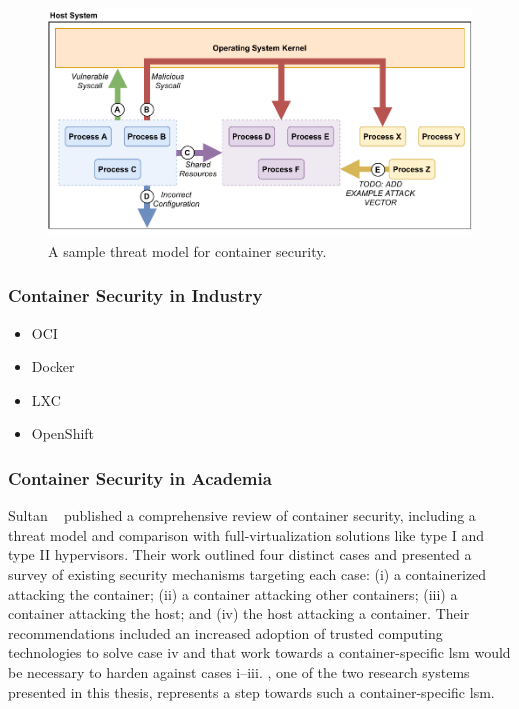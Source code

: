 \begin{figure}[tbp]
  \centering
  \includegraphics[width=0.8\linewidth]{figs/background/container_security.pdf}
  \caption[A sample threat model for container security]{
    A sample threat model for container security.
  }%
  \label{fig:containersec}
\end{figure}

\subsubsection{Container Security in Industry}%
\label{sss:container-security-industry}

\begin{inprogress}
  \begin{itemize}
    \item OCI

    \item Docker~\cite{bui2015_docker_analysis, combe2016_to_docker}

    \item LXC

    \item OpenShift
  \end{itemize}
\end{inprogress}

\subsubsection{Container Security in Academia}%
\label{sss:container-security-academia}

Sultan \etal~\cite{sultan2019_container_security} published a comprehensive review of
container security, including a threat model and comparison with full-virtualization
solutions like type I and type II hypervisors. Their work outlined four distinct cases and
presented a survey of existing security mechanisms targeting each case: (i)
a containerized attacking the container; (ii) a container attacking other containers;
(iii) a container attacking the host; and (iv) the host attacking a container. Their
recommendations included an increased adoption of trusted computing technologies to solve
case iv and that work towards a container-specific \gls{lsm} would be necessary to harden
against cases i--iii. \bpfcontain{}, one of the two research systems presented in this thesis,
represents a step towards such a container-specific \gls{lsm}.

